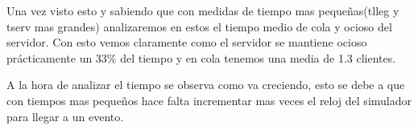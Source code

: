 \documentclass[]{article}
\begin{document}
Una vez visto esto y sabiendo que con medidas de tiempo mas pequeñas(tlleg y tserv mas grandes) analizaremos en estos el tiempo medio de cola y ocioso del servidor. Con esto vemos claramente como el servidor se mantiene ocioso prácticamente un 33\% del tiempo y en cola tenemos una media de 1.3 clientes.
\newline

A la hora de analizar el tiempo se observa como va creciendo, esto se debe a que con tiempos mas pequeños hace falta incrementar mas veces el reloj del simulador para llegar a un evento. 
\end{document}
